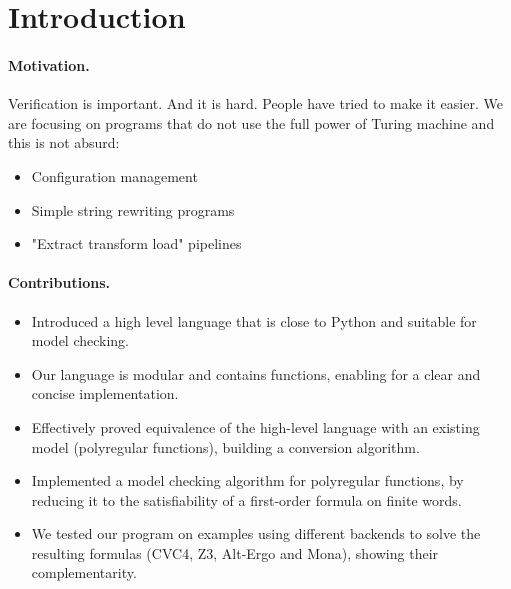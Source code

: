 \section{Introduction}
\label{sec:intro}

\paragraph{Motivation.} Verification is important. And it is hard. People have
tried to make it easier. We are focusing on programs that do not use the full
power of Turing machine and this is not absurd:
\begin{itemize}
    \item Configuration management
    \item Simple string rewriting programs
    \item "Extract transform load" pipelines
\end{itemize}

\paragraph{Contributions.} 

\begin{itemize}
    \item Introduced a high level language that is close to Python and 
        suitable for model checking.
    \item Our language is modular and contains functions, enabling for a clear
        and concise implementation.
    \item Effectively proved equivalence of the high-level language with an existing
        model (polyregular functions), building a conversion algorithm.
    \item Implemented a model checking algorithm for polyregular functions,
        by reducing it to the satisfiability of a first-order formula on finite words.
    \item We tested our program on examples using different backends to solve
        the resulting formulas (CVC4, Z3, Alt-Ergo and Mona), showing
        their complementarity.
\end{itemize}
